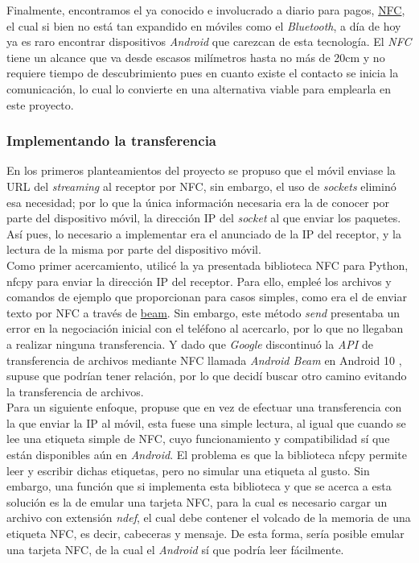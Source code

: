 Finalmente, encontramos el ya conocido e involucrado a diario para pagos,
\href{https://es.wikipedia.org/wiki/Comunicaci%C3%B3n_de_campo_cercano}{NFC}, 
el cual si bien no está tan expandido en móviles como el \emph{Bluetooth}, a día
de hoy ya es raro encontrar dispositivos \emph{Android} que carezcan de esta
tecnología. El \emph{NFC} tiene un alcance que va desde escasos milímetros hasta
no más de 20cm y no requiere tiempo de descubrimiento pues en cuanto existe el
contacto se inicia la comunicación, lo cual lo convierte en una alternativa
viable para emplearla en este proyecto. 

\subsubsection{Implementando la transferencia}

En los primeros planteamientos del proyecto se propuso que el móvil enviase la
URL del \emph{streaming} al receptor por NFC, sin embargo, el uso de
\emph{sockets} eliminó esa necesidad; por lo que la única información necesaria
era la de conocer por parte del dispositivo móvil, la dirección IP del
\emph{socket} al que enviar los paquetes. Así pues, lo necesario a implementar
era el anunciado de la IP del receptor, y la lectura de la misma por parte del
dispositivo móvil.\\

Como primer acercamiento, utilicé la ya presentada biblioteca NFC para Python,
nfcpy para enviar la dirección IP del receptor. Para ello, empleé los archivos y
comandos de ejemplo que proporcionan para casos simples, como era el de enviar
texto por NFC a través de
\href{https://nfcpy.readthedocs.io/en/latest/examples/beam.html}{beam}. Sin
embargo, este método \emph{send} presentaba un error en la negociación inicial
con el teléfono al acercarlo, por lo que no llegaban a realizar ninguna
transferencia. Y dado que \emph{Google} discontinuó la \emph{API} de
transferencia de archivos mediante NFC llamada \emph{Android Beam} en Android 10
\cite{android-beam-deprecated}, supuse que podrían tener relación, por lo que
decidí buscar otro camino evitando la transferencia de archivos.\\

Para un siguiente enfoque, propuse que en vez de efectuar una transferencia con
la que enviar la IP al móvil, esta fuese una simple lectura, al igual que cuando
se lee una etiqueta simple de NFC, cuyo funcionamiento y compatibilidad sí que
están disponibles aún en \emph{Android}. El problema es que la biblioteca nfcpy
permite leer y escribir dichas etiquetas, pero no simular una etiqueta al gusto.
Sin embargo, una función que si implementa esta biblioteca y que se acerca a
esta solución es la de emular una tarjeta NFC, para la cual es necesario cargar
un archivo con extensión \emph{ndef}, el cual debe contener el volcado de la
memoria de una etiqueta NFC, es decir, cabeceras y mensaje. De esta forma, sería
posible emular una tarjeta NFC, de la cual el \emph{Android} sí que podría leer
fácilmente.\\

